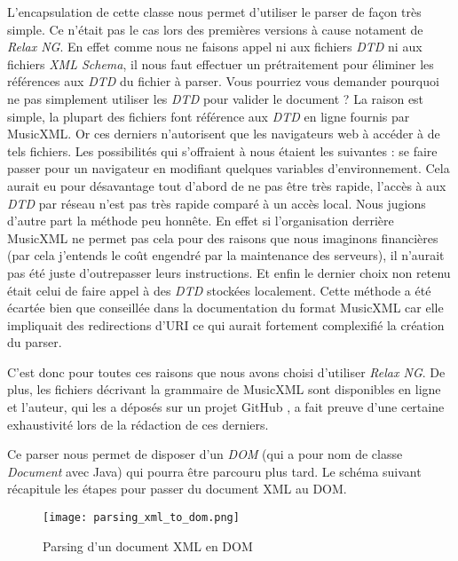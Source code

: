 \par
L'encapsulation de cette classe nous permet d'utiliser le parser de façon très simple. Ce n'était pas le cas lors des premières versions à cause notament de \emph{Relax NG}. En effet comme nous ne faisons appel ni aux fichiers \emph{DTD} ni aux fichiers \emph{XML Schema}, il nous faut effectuer un prétraitement pour éliminer les références aux \emph{DTD} du fichier à parser. Vous pourriez vous demander pourquoi ne pas simplement utiliser les \emph{DTD} pour valider le document ? La raison est simple, la plupart des fichiers font référence aux \emph{DTD} en ligne fournis par MusicXML. Or ces derniers n'autorisent que les navigateurs web à accéder à de tels fichiers. Les possibilités qui s'offraient à nous étaient les suivantes : se faire passer pour un navigateur en modifiant quelques variables d’environnement. Cela aurait eu pour désavantage tout d'abord de ne pas être très rapide, l'accès à aux \emph{DTD} par réseau n'est pas très rapide comparé à un accès local. Nous jugions d'autre part la méthode peu honnête. En effet si l'organisation derrière MusicXML ne permet pas cela pour des raisons que nous imaginons financières (par cela j'entends le coût engendré par la maintenance des serveurs), il n'aurait pas été juste d'outrepasser leurs instructions. Et enfin le dernier choix non retenu était celui de faire appel à des \emph{DTD} stockées localement. Cette méthode a été écartée bien que conseillée dans la documentation du format MusicXML car elle impliquait des redirections d'URI ce qui aurait fortement complexifié la création du parser.

\par
C'est donc pour toutes ces raisons que nous avons choisi d'utiliser \emph{Relax NG}. De plus, les fichiers décrivant la grammaire de MusicXML sont disponibles en ligne et l'auteur, qui les a déposés sur un projet GitHub \cite{relaxng_for_musicxml}, a fait preuve d'une certaine exhaustivité lors de la rédaction de ces derniers.

\par
Ce parser nous permet de disposer d'un \emph{DOM} (qui a pour nom de classe \emph{Document} avec Java) qui pourra être parcouru plus tard. Le schéma suivant récapitule les étapes pour passer du document XML au DOM.


\begin{figure}[!h]
\centering
\texttt{[image: parsing\_xml\_to\_dom.png]}\\[1cm]
\caption{Parsing d'un document XML en DOM}
\end{figure}


